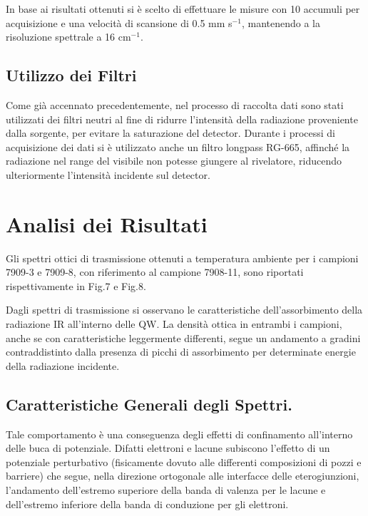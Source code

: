 \documentclass[journal]{IEEEtran}
\begin{document}
In base ai risultati ottenuti si è scelto di effettuare le misure con 10 accumuli per acquisizione e una velocità di scansione di 0.5 mm s$^{-1}$, mantenendo a la risoluzione spettrale a 16 cm$^{-1}$.





\subsection{Utilizzo dei Filtri}

Come già accennato precedentemente, nel processo di raccolta dati sono stati utilizzati dei filtri neutri al fine di ridurre l'intensità della radiazione proveniente dalla sorgente, per evitare la saturazione del detector. Durante i processi di acquisizione dei dati si è utilizzato anche un filtro longpass RG-665, affinché la radiazione nel range del visibile non potesse giungere al rivelatore, riducendo ulteriormente l'intensità incidente sul detector.

\section{Analisi dei Risultati}

Gli spettri ottici di trasmissione ottenuti a temperatura ambiente per i campioni 7909-3 e 7909-8, con riferimento al campione 7908-11, sono riportati rispettivamente in Fig.7 e Fig.8.





Dagli spettri di trasmissione si osservano le caratteristiche dell'assorbimento della radiazione IR all'interno delle QW. La densità ottica in entrambi i campioni, anche se con caratteristiche leggermente differenti, segue un andamento a gradini contraddistinto dalla presenza di picchi di assorbimento per determinate energie della radiazione incidente.

\subsection{Caratteristiche Generali degli Spettri.}

Tale comportamento è una conseguenza degli effetti di confinamento all’interno delle buca di potenziale. Difatti elettroni e lacune subiscono l'effetto di un potenziale perturbativo (fisicamente dovuto alle differenti composizioni di pozzi e barriere) che segue, nella direzione ortogonale alle interfacce delle eterogiunzioni, l'andamento dell'estremo superiore della banda di valenza per le lacune e dell'estremo inferiore della banda di conduzione per gli elettroni.
\end{document}
